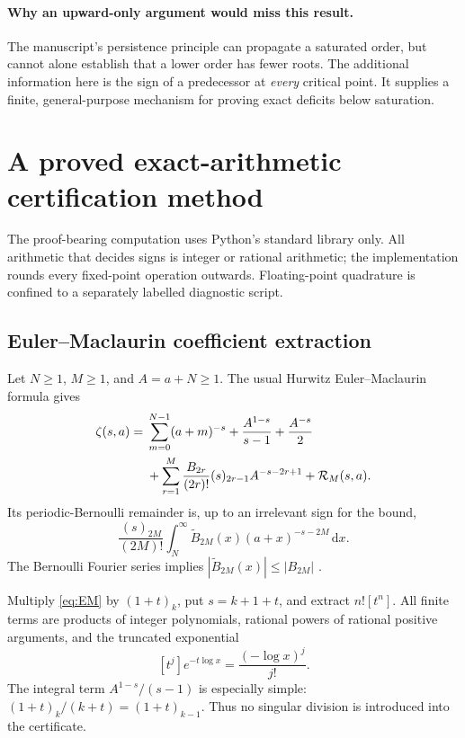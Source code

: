 \documentclass[11pt]{article}
\numberwithin{equation}{section}
\theoremstyle{definition}\newtheorem{definition}[theorem]{Definition}
\theoremstyle{remark}\newtheorem{remark}[theorem]{Remark}
\newcommand{\dd}{\,\mathrm d}
\begin{document}
\paragraph{Why an upward-only argument would miss this result.}
The manuscript's persistence principle can propagate a saturated order, but cannot alone establish that a lower order has fewer roots. The additional information here is the sign of a predecessor at \emph{every} critical point. It supplies a finite, general-purpose mechanism for proving exact deficits below saturation.

\section{A proved exact-arithmetic certification method}\label{sec:certification}
The proof-bearing computation uses Python's standard library only. All arithmetic that decides signs is integer or rational arithmetic; the implementation rounds every fixed-point operation outwards. Floating-point quadrature is confined to a separately labelled diagnostic script.

\subsection{Euler--Maclaurin coefficient extraction}
Let $N\geq1$, $M\geq1$, and $A=a+N\geq1$. The usual Hurwitz Euler--Maclaurin formula \cite{dlmfhurwitz} gives
\begin{align}\label{eq:EM}
\zeta(s,a)={}&\sum_{m=0}^{N-1}(a+m)^{-s}
+\frac{A^{1-s}}{s-1}+\frac{A^{-s}}2\notag\\
&+\sum_{r=1}^{M}\frac{B_{2r}}{(2r)!}(s)_{2r-1}A^{-s-2r+1}
+\mathcal R_M(s,a).
\end{align}
Its periodic-Bernoulli remainder is, up to an irrelevant sign for the bound,
\[
\frac{(s)_{2M}}{(2M)!}\int_N^\infty \widetilde B_{2M}(x)(a+x)^{-s-2M}\dd x.
\]
The Bernoulli Fourier series implies
$|\widetilde B_{2M}(x)|\leq|B_{2M}|$ \cite{dlmfbernoulli}.

Multiply \eqref{eq:EM} by $(1+t)_k$, put $s=k+1+t$, and extract $n![t^n]$. All finite terms are products of integer polynomials, rational powers of rational positive arguments, and the truncated exponential
\[
[t^j]e^{-t\log x}=\frac{(-\log x)^j}{j!}.
\]
The integral term $A^{1-s}/(s-1)$ is especially simple: $(1+t)_k/(k+t)=(1+t)_{k-1}$. Thus no singular division is introduced into the certificate.
\end{document}
